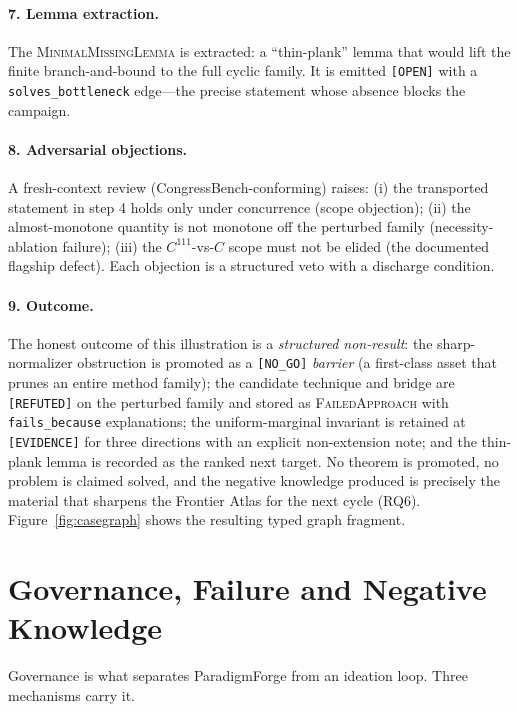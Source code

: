\documentclass[11pt]{article}
\theoremstyle{definition}
\theoremstyle{remark}
\newcommand{\state}[1]{\texttt{[#1]}}
\newcommand{\rel}[1]{\texttt{#1}}
\newcommand{\ntype}[1]{\textsc{#1}}
\newcommand{\PF}{ParadigmForge}
\begin{document}
\paragraph{7. Lemma extraction.} The \ntype{MinimalMissingLemma} is extracted: a ``thin-plank''
lemma that would lift the finite branch-and-bound to the full cyclic family. It is emitted
\state{OPEN} with a \rel{solves\_bottleneck} edge---the precise statement whose absence blocks the
campaign.

\paragraph{8. Adversarial objections.} A fresh-context review (CongressBench-conforming) raises:
(i) the transported statement in step 4 holds only under concurrence (scope objection); (ii) the
almost-monotone quantity is not monotone off the perturbed family (necessity-ablation failure);
(iii) the $C^{111}$-vs-$C$ scope must not be elided (the documented flagship defect). Each objection
is a structured veto with a discharge condition.

\paragraph{9. Outcome.} The honest outcome of this illustration is a \emph{structured non-result}:
the sharp-normalizer obstruction is promoted as a \state{NO\_GO} \emph{barrier} (a first-class asset
that prunes an entire method family); the candidate technique and bridge are \state{REFUTED} on the
perturbed family and stored as \ntype{FailedApproach} with \rel{fails\_because} explanations; the
uniform-marginal invariant is retained at \state{EVIDENCE} for three directions with an explicit
non-extension note; and the thin-plank lemma is recorded as the ranked next target. No theorem is
promoted, no problem is claimed solved, and the negative knowledge produced is precisely the material
that sharpens the Frontier Atlas for the next cycle (RQ6). Figure~\ref{fig:casegraph} shows the
resulting typed graph fragment.

\section{Governance, Failure and Negative Knowledge}
\label{sec:governance}

Governance is what separates \PF{} from an ideation loop. Three mechanisms carry it.
\end{document}
